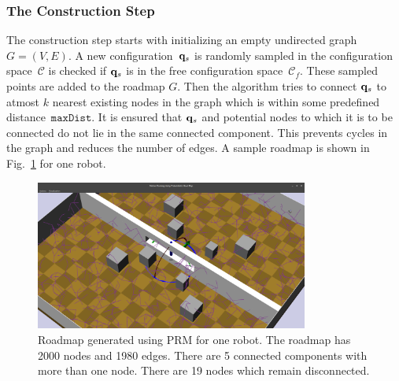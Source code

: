\documentclass[12pt,a4paper, onecolumn]{IEEEtran}
\newcommand{\fgref}[1]{Fig.~\ref{#1}}
\begin{document}
\subsubsection{The Construction Step}
The construction step starts with initializing an empty undirected graph $G=(V,E)$. A new
configuration~$\mathbf{q}_s$ is randomly sampled in the configuration space~$\mathcal C$ is
checked if $\mathbf{q}_s$ is in the free configuration space~$\mathcal C_f$. These sampled
points are added to the roadmap $G$. Then the algorithm tries to connect $\mathbf{q}_s$ to
atmost $k$ nearest existing nodes in the graph which is within some predefined
distance~${\texttt {maxDist}}$. It is ensured that $\mathbf{q}_s$ and potential nodes to which
it is to be connected do not lie in the same connected component. This prevents cycles in
the graph and reduces the number of edges. A sample roadmap is shown in
\fgref{fig:roadmap} for one robot.
\begin{figure}[htbp]
  \centering
  \includegraphics[width=0.8\textwidth]{prm_roadmap.png}
  \caption{Roadmap generated using PRM for one robot. The roadmap has 2000 nodes and 1980
  edges. There are 5 connected components with more than one node. There are 19 nodes
which remain disconnected.}
  \label{fig:roadmap}
\end{figure}



\end{document}
